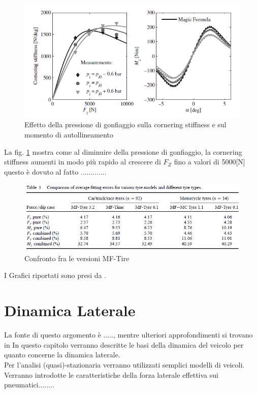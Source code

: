 \begin{figure}[ht]
    \centering
    \includegraphics[scale=0.8]{Immagini/Tyres/Tyre pressure effects for a passenger car tyre.png}
    \caption{Effetto della pressione di gonfiaggio sulla cornering stiffness e sul momento di autollineamento}
    \label{fig:Pressure effects}
\end{figure}

La fig. \ref{fig:Pressure effects} mostra come al diminuire della pressione di gonfiaggio, la cornering stiffness aumenti in modo più rapido al crescere di $F_Z$ fino a valori di 5000[N] questo è dovuto al fatto .............\\

\begin{figure}[ht]
    \centering
    \includegraphics[scale=0.8]{Immagini/Tyres/comparison MF-Tire version.png}
    \caption{Confronto fra le versioni MF-Tire}
    \label{fig:Comparison MF-Tire version}
\end{figure}
 

I Grafici riportati sono presi da \cite{Besselink2010AnIM}.\\

\section{Dinamica Laterale}
La fonte di questo argomento è ....., mentre ulteriori approfondimenti si trovano in 
In questo capitolo verranno descritte le basi della dinamica del veicolo per quanto concerne la dinamica laterale.
\\Per l'analisi (quasi)-stazionaria verranno utilizzati semplici modelli di veicoli. 
Verranno introdotte le caratteristiche della forza laterale effettiva sui pneumatici........ 




